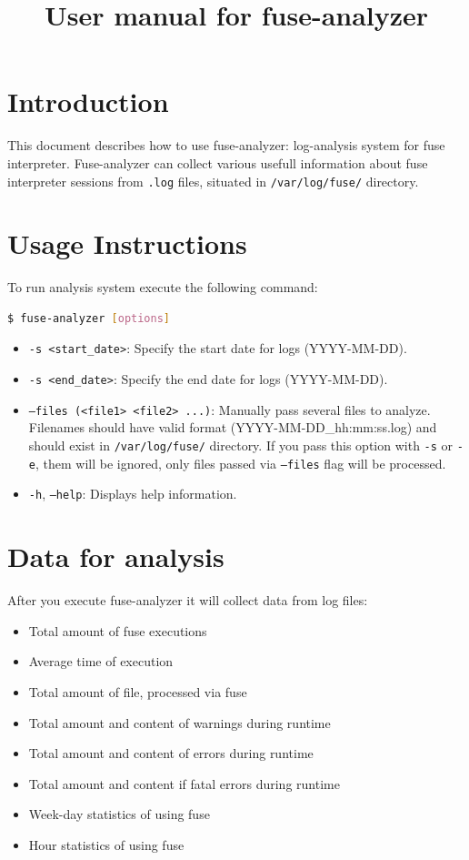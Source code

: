 \documentclass[a4paper,12pt]{article}
\title{\textbf{User manual for fuse-analyzer}}
\author{}
\date{}
\begin{document}
\maketitle

\section{Introduction}
This document describes how to use fuse-analyzer: log-analysis system for fuse interpreter. Fuse-analyzer can collect various usefull information about fuse interpreter sessions from \texttt{.log} files, situated in \texttt{/var/log/fuse/} directory.

\section{Usage Instructions}
To run analysis system execute the following command:
\begin{lstlisting}[language=bash]
  $ fuse-analyzer [options]
\end{lstlisting}
\begin{itemize}
	\item \texttt{-s <start\_date>}: Specify the start date for logs (YYYY-MM-DD).
	\item \texttt{-s <end\_date>}: Specify the end date for logs (YYYY-MM-DD).
	\item \texttt{--files (<file1> <file2> ...)}: Manually pass several files to analyze. Filenames should have valid format (YYYY-MM-DD\_hh:mm:ss.log) and should exist in \texttt{/var/log/fuse/} directory. If you pass this option with \texttt{-s} or \texttt{-e}, them will be ignored, only files passed via \texttt{--files} flag will be processed.
	\item \texttt{-h}, \texttt{--help}: Displays help information.
\end{itemize}

\newpage

\section{Data for analysis}
After you execute fuse-analyzer it will collect data from log files:
\begin{itemize}
	\item Total amount of fuse executions
	\item Average time of execution
	\item Total amount of file, processed via fuse
	\item Total amount and content of warnings during runtime
	\item Total amount and content of errors during runtime
	\item Total amount and content if fatal errors during runtime
	\item Week-day statistics of using fuse
	\item Hour statistics of using fuse
\end{itemize}
\end{document}
